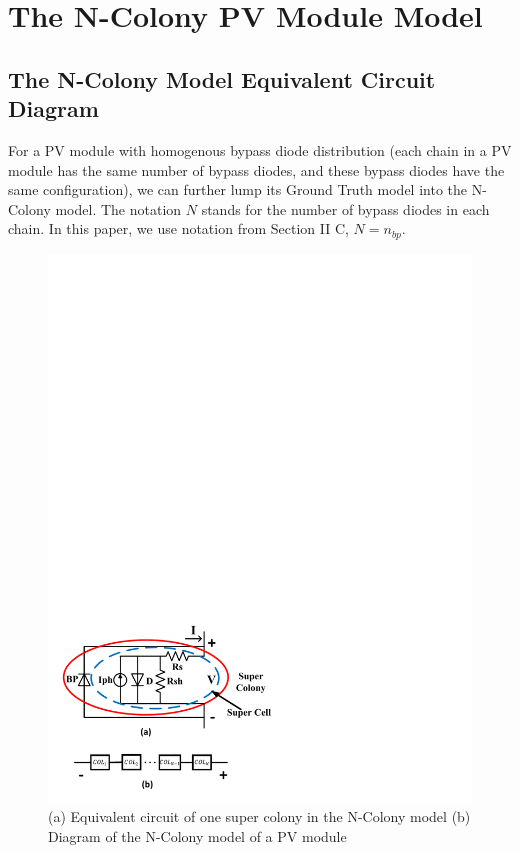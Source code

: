 \section{The N-Colony PV Module Model}
\subsection{The N-Colony Model Equivalent Circuit Diagram}
For a PV module with homogenous bypass diode distribution (each chain in a PV module has the same number of bypass diodes, and these bypass diodes have the same configuration), we can further lump its Ground Truth model into the N-Colony model. The notation $N$ stands for the number of bypass diodes in each chain. In this paper, we use notation from Section II C, $N = n_{bp}$.

\begin{figure}[tb]
    \centering
    \includegraphics[width=1\columnwidth]{figs/nc_model_diagram.pdf}
    \caption{(a) Equivalent circuit of one super colony in the N-Colony model (b) Diagram of the N-Colony model of a PV module}
    \label{fig:ncDiagram}
\end{figure}

